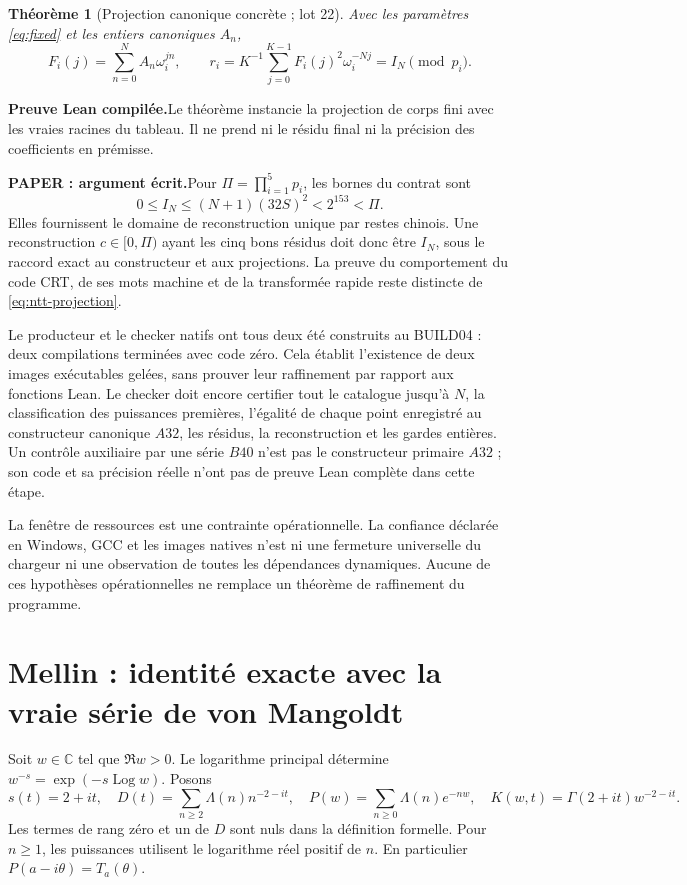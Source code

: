 \documentclass[11pt,a4paper]{article}
\newtheorem{theorem}{Théorème}[section]
\theoremstyle{remark}
\newcommand{\Lam}{\Lambda}
\newcommand{\C}{\mathbb C}
\newcommand{\paid}{\textbf{Preuve Lean compilée.}\space}
\newcommand{\paper}{\textbf{PAPER : argument écrit.}\space}
\DeclareMathOperator{\Log}{Log}
\begin{document}
\begin{theorem}[Projection canonique concrète ; lot 22]
Avec les paramètres \eqref{eq:fixed} et les entiers canoniques $A_n$,
\begin{equation}\label{eq:ntt-projection}
F_i(j)=\sum_{n=0}^{N}A_n\omega_i^{jn},\qquad
r_i=K^{-1}\sum_{j=0}^{K-1}F_i(j)^2\omega_i^{-Nj}
=I_N\pmod {p_i}.
\end{equation}
\end{theorem}
\paid Le théorème instancie la projection de corps fini avec les
vraies racines du tableau. Il ne prend ni le résidu final ni la précision
des coefficients en prémisse.

\paper Pour $\Pi=\prod_{i=1}^5p_i$, les bornes du contrat sont
\begin{equation}\label{eq:crt-size}
0\le I_N\le(N+1)(32S)^2<2^{153}<\Pi.
\end{equation}
Elles fournissent le domaine de reconstruction unique par restes chinois.
Une reconstruction $c\in[0,\Pi)$ ayant les cinq bons résidus doit donc être
$I_N$, sous le raccord exact au constructeur et aux projections.
La preuve du comportement du code CRT, de ses mots machine et de la
transformée rapide reste distincte de \eqref{eq:ntt-projection}.

Le producteur et le checker natifs ont tous deux été construits au
BUILD04 : deux compilations terminées avec code zéro. Cela établit
l'existence de deux images exécutables gelées, sans prouver leur raffinement
par rapport aux fonctions Lean. Le checker doit encore certifier tout le
catalogue jusqu'à $N$, la classification des puissances premières, l'égalité
de chaque point enregistré au constructeur canonique $A32$, les résidus,
la reconstruction et les gardes entières. Un contrôle auxiliaire par une
série $B40$ n'est pas le constructeur primaire $A32$ ; son code et sa
précision réelle n'ont pas de preuve Lean complète dans cette étape.

La fenêtre de ressources est une contrainte opérationnelle. La confiance
déclarée en Windows, GCC et les images natives n'est ni une fermeture
universelle du chargeur ni une observation de toutes les dépendances
dynamiques. Aucune de ces hypothèses opérationnelles ne remplace un
théorème de raffinement du programme.

\clearpage
\section{Mellin : identité exacte avec la vraie série de von Mangoldt}\label{sec:mellin}
Soit $w\in\C$ tel que $\Re w>0$. Le logarithme principal détermine
$w^{-s}=\exp(-s\Log w)$. Posons
\begin{equation}\label{eq:mellin-objects}
s(t)=2+it,\quad
D(t)=\sum_{n\ge2}\Lam(n)n^{-2-it},\quad
P(w)=\sum_{n\ge0}\Lam(n)e^{-nw},\quad
K(w,t)=\Gamma(2+it)w^{-2-it}.
\end{equation}
Les termes de rang zéro et un de $D$ sont nuls dans la définition formelle. Pour
$n\ge1$, les puissances utilisent le logarithme réel positif de $n$.
En particulier $P(a-i\theta)=T_a(\theta)$.
\end{document}
